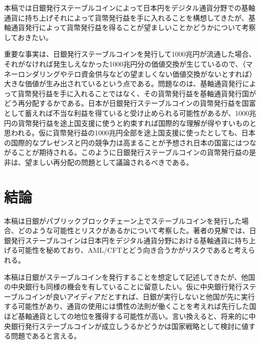 \documentclass[dvipdfmx,a4paper]{jsarticle}
\begin{document}
本稿では日銀発行ステーブルコインによって日本円をデジタル通貨分野での基軸通貨に持ち上げそれによって貨幣発行益を手に入れることを構想してきたが、基軸通貨発行によって貨幣発行益を得ることが望ましいことかどうかについて考察しておきたい。

重要な事実は、日銀発行ステーブルコインを発行して1000兆円が流通した場合、それがなければ発生しえなかった1000兆円分の価値交換が生じているので、（マネーロンダリングやテロ資金供与などの望ましくない価値交換がないとすれば）大きな価値が生み出されているという点である。問題なのは、基軸通貨発行によって貨幣発行益を手に入れることではなく、その貨幣発行益を基軸通貨発行国がどう再分配するかである。日本が日銀発行ステーブルコインの貨幣発行益を国富として蓄えれば不当な利益を得ていると受け止められる可能性があるが、1000兆円の貨幣発行益を途上国支援に使うと約束すれば国際的な理解が得やすいものと思われる。仮に貨幣発行益の1000兆円全部を途上国支援に使ったとしても、日本の国際的なプレゼンスと円の競争力は高まることが予想され日本の国富にはつながることが期待される。このように日銀発行ステーブルコインの貨幣発行益の是非は、望ましい再分配の問題として議論されるべきである。

\section{結論}

本稿は日銀がパブリックブロックチェーン上でステーブルコインを発行した場合、どのような可能性とリスクがあるかについて考察した。著者の見解では、日銀発行ステーブルコインは日本円をデジタル通貨分野における基軸通貨に持ち上げる可能性を秘めており、AML/CFTとどう向き合うかがリスクであると考えられる。

本稿は日銀がステーブルコインを発行することを想定して記述してきたが、他国の中央銀行も同様の機会を有していることに留意したい。仮に中央銀行発行ステーブルコインが良いアイディアだとすれば、日銀が実行しないと他国が先に実行する可能性があり、通貨の使用には慣性の法則が働くことを考えれば先行した国ほど基軸通貨としての地位を獲得する可能性が高い。言い換えると、将来的に中央銀行発行ステーブルコインが成立しうるかどうかは国家戦略として検討に値する問題であると言える。




\end{document}
